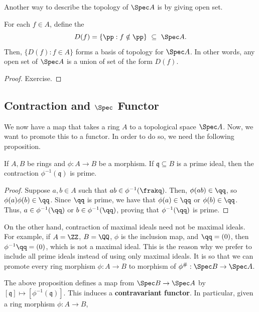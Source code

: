 Another way to describe the topology of $\Spec A$
is by giving open set.
\begin{proposition}
    For each $f\in A$, define the 
    $$D(f) = \{\pp : f\notin \pp\} \ \subseteq\ \Spec A.$$
    Then, $\{D(f) : f\in A\}$ forms a basis of topology
    for $\Spec A$. In other words, any open set of $\Spec A$
    is a union of set of the form $D(f)$.
\end{proposition}
\begin{proof}
    Exercise.
\end{proof}
\subsection{Contraction and \texorpdfstring{$\Spec$}{Spec} Functor}
We now have a map that takes a ring $A$ to a topological space $\Spec A$.
Now, we want to promote this to a functor.
In order to do so, we need the following proposition.
\begin{proposition}
    If $A,B$ be rings and $\phi : A\to B$ be a morphism.
    If $\mathfrak q\subseteq B$ is a prime ideal,
    then the contraction $\phi^{-1}(\mathfrak q)$
    is prime.
\end{proposition}
\begin{proof}
    Suppose $a,b\in A$ such that $ab\in \phi^{-1}(\frakq)$.
    Then, $\phi(ab)\in\qq$, so $\phi(a)\phi(b)\in\qq$.
    Since $\qq$ is prime, we have that 
    $\phi(a)\in\qq$ or $\phi(b)\in\qq$.
    Thus, $a\in\phi^{-1}(\qq)$ or $b\in\phi^{-1}(\qq)$,
    proving that $\phi^{-1}(\qq)$ is prime.
\end{proof}
\begin{remark}
    \label{rmk:why_prime}
    On the other hand, contraction of maximal ideals
    need not be maximal ideals.
    For example, if $A=\ZZ$, $B=\QQ$, $\phi$
    is the inclusion map, and $\qq=(0)$,
    then $\phi^{-1}\qq = (0)$, which is not a maximal ideal.
    This is the reason why we prefer to include all 
    prime ideals instead of using only maximal ideals.
    It is so that we can promote every ring morphism
    $\phi : A\to B$ to morphism of $\phi^\# : \Spec B\to \Spec A$.
\end{remark}
The above proposition defines a map from
$\Spec B\to \Spec A$ by 
$[\mathfrak q]\mapsto [\phi^{-1}(\mathfrak q)]$.
This induces a \textbf{contravariant functor}.
In particular, given a ring morphism $\phi : A\to B$,
